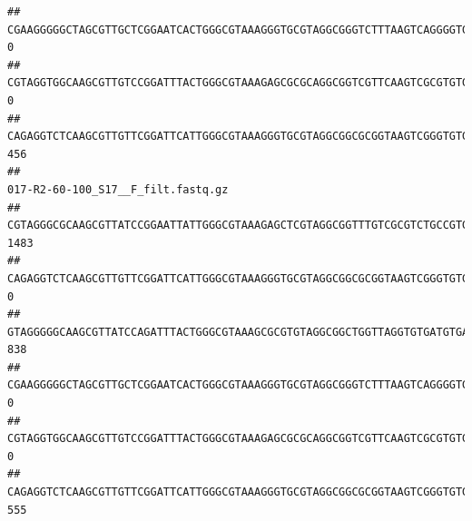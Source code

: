 \documentclass[]{article}
\begin{document}
\begin{verbatim}
## CGAAGGGGGCTAGCGTTGCTCGGAATCACTGGGCGTAAAGGGTGCGTAGGCGGGTCTTTAAGTCAGGGGTGAAATCCTGGAGCTCAACTCCAGAACTGCCTTTGATACTGAAGATCTTGAGTTCGGGAGAGGTGAGTGGAACTGCGAGTGTAGAGGTGAAATTCGTAGATATTCGCAAGAACACCAGTGGCGAAGGCGGCTCACTGGCCCGATACTGACGCTGAGGCACGAAAGCGTGGGGAGCAAACA                                 0
## CGTAGGTGGCAAGCGTTGTCCGGATTTACTGGGCGTAAAGAGCGCGCAGGCGGTCGTTCAAGTCGCGTGTGAAAGCCCCCGGCTCAACTGGGGAGGGTCACGCGATACTGATCGACTCGAAGGCAGGAGAGGGTAGTGGAATTCCCGGTGTAGTGGTGAAATGCGTAGATATCGGGAGGAACACCAGTGGCGAAGGCGACTACCTGGCCTGTTCTTGACGCTGAGGCGCGAAAGCTAGGGGAGCAAACG                                 0
## CAGAGGTCTCAAGCGTTGTTCGGATTCATTGGGCGTAAAGGGTGCGTAGGCGGCGCGGTAAGTCGGGTGTGAAATCTCGGGGCTTAACTCCGAAACTGCATTCGATACTGCCGTGCTTGAGGACTGGAGAGGAGACTGGAATTTACGGTGTAGCGGTGAAATGCGTAGATATCGTAAGGAAGACCAGTGGCGAAGGCGGGTCTCTGGACAGTTCCTGACGCTGAGGCACGAAGGCCAGGGGAGCAAACG                               456
##                                                                                                                                                                                                                                                           017-R2-60-100_S17__F_filt.fastq.gz
## CGTAGGGCGCAAGCGTTATCCGGAATTATTGGGCGTAAAGAGCTCGTAGGCGGTTTGTCGCGTCTGCCGTGAAAGTCCGGGGCTCAACTCCGGATCTGCGGTGGGTACGGGCAGACTAGAGTGATGTAGGGGAGACTGGAATTCCTGGTGTAGCGGTGAAATGCGCAGATATCAGGAGGAACACCGATGGCGAAGGCAGGTCTCTGGGCATTAACTGACGCTGAGGAGCGAAAGCATGGGGAGCGAACA                               1483
## CAGAGGTCTCAAGCGTTGTTCGGATTCATTGGGCGTAAAGGGTGCGTAGGCGGCGCGGTAAGTCGGGTGTGAAATCTCGGAGCTTAACTCCGAAACTGCATTCGATACTGCCGTGCTTGAGGACTGGAGAGGAGACTGGAATTTACGGTGTAGCGGTGAAATGCGTAGATATCGTAAGGAAGACCAGTGGCGAAGGCGGGTCTCTGGACAGTTCCTGACGCTGAGGCACGAAGGCCAGGGGAGCAAACG                                  0
## GTAGGGGGCAAGCGTTATCCAGATTTACTGGGCGTAAAGCGCGTGTAGGCGGCTGGTTAGGTGTGATGTGAAATCTTCCGGCTCAACCGGAAAACTGCATTGCAAACCGGCCTGGCTAGAGTGCAGGAGAGGGAAGCGGAATTCCAGGTGTAGCGGTGAAATGCGTAGATATCTGGAGGAACACCAGTGGCGAAGGCGGCTTCCTGGCCTGCAACTGACGCTGAGACGCGAAAGCGTGGGGAGCGAAC                                 838
## CGAAGGGGGCTAGCGTTGCTCGGAATCACTGGGCGTAAAGGGTGCGTAGGCGGGTCTTTAAGTCAGGGGTGAAATCCTGGAGCTCAACTCCAGAACTGCCTTTGATACTGAAGATCTTGAGTTCGGGAGAGGTGAGTGGAACTGCGAGTGTAGAGGTGAAATTCGTAGATATTCGCAAGAACACCAGTGGCGAAGGCGGCTCACTGGCCCGATACTGACGCTGAGGCACGAAAGCGTGGGGAGCAAACA                                  0
## CGTAGGTGGCAAGCGTTGTCCGGATTTACTGGGCGTAAAGAGCGCGCAGGCGGTCGTTCAAGTCGCGTGTGAAAGCCCCCGGCTCAACTGGGGAGGGTCACGCGATACTGATCGACTCGAAGGCAGGAGAGGGTAGTGGAATTCCCGGTGTAGTGGTGAAATGCGTAGATATCGGGAGGAACACCAGTGGCGAAGGCGACTACCTGGCCTGTTCTTGACGCTGAGGCGCGAAAGCTAGGGGAGCAAACG                                  0
## CAGAGGTCTCAAGCGTTGTTCGGATTCATTGGGCGTAAAGGGTGCGTAGGCGGCGCGGTAAGTCGGGTGTGAAATCTCGGGGCTTAACTCCGAAACTGCATTCGATACTGCCGTGCTTGAGGACTGGAGAGGAGACTGGAATTTACGGTGTAGCGGTGAAATGCGTAGATATCGTAAGGAAGACCAGTGGCGAAGGCGGGTCTCTGGACAGTTCCTGACGCTGAGGCACGAAGGCCAGGGGAGCAAACG                                555

\end{verbatim}
\end{document}
